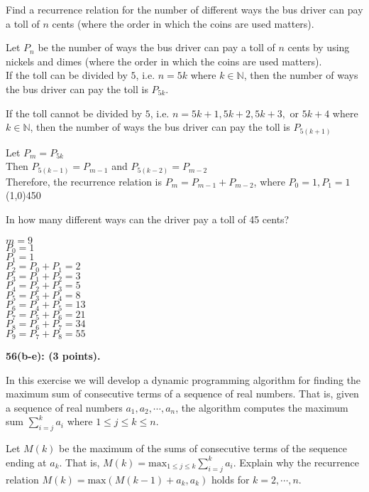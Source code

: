 \documentclass[12pt]{article}  %
\begin{document}
\noindent
Find a recurrence relation for the number of different ways the bus driver can pay a toll of $n$ cents (where the order in which the coins are used matters).

\noindent
Let $P_n$ be the number of ways the bus driver can pay a toll of $n$ cents by using nickels and dimes (where the order in which the coins are used matters).\\
If the toll can be divided by $5$, i.e. $n=5k$ where $k\in\mathbb{N}$, then the number of ways the bus driver can pay the toll is $P_{5k}$.

\noindent
If the toll cannot be divided by $5$, i.e. $n=5k+1,5k+2,5k+3,$ or $5k+4$ where $k\in\mathbb{N}$, then the number of ways the bus driver can pay the toll is $P_{5(k+1)}$

\noindent
Let $P_m=P_{5k}$\\
Then $P_{5(k-1)}=P_{m-1}$ and $P_{5(k-2)}=P_{m-2}$\\
Therefore, the recurrence relation is $P_m=P_{m-1}+P_{m-2}$, where $P_0=1,P_1=1$\\
\line(1,0){450}

\noindent
In how many different ways can the driver pay a toll of 45 cents?

\noindent
$m=9$\\
$P_0=1$\\
$P_1=1$\\
$P_2=P_0+P_1=2$\\
$P_3=P_1+P_2=3$\\
$P_4=P_2+P_3=5$\\
$P_5=P_3+P_4=8$\\
$P_6=P_4+P_5=13$\\
$P_7=P_5+P_6=21$\\
$P_8=P_6+P_7=34$\\
$P_9=P_7+P_8=55$

\clearpage
\noindent
{\bf 56(b-e): (3 points).}

\noindent
In this exercise we will develop a dynamic programming algorithm for finding the maximum sum of consecutive terms of a sequence of real numbers. That is, given a sequence of real numbers $a_1,a_2,\cdots, a_n$, the algorithm computes the maximum sum $\displaystyle\sum_{i=j}^k a_i$ where $1\leq j\leq k\leq n$.

\noindent
Let $M(k)$ be the maximum of the sums of consecutive terms of the sequence ending at $a_k$. That is, $\displaystyle M(k)=\textrm{max}_{1\leq j\leq k}\sum_{i=j}^k a_i$. Explain why the recurrence relation $M(k)=\textrm{max}(M(k-1)+a_k,a_k)$ holds for $k=2,\cdots,n$.
\end{document}
